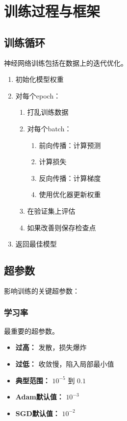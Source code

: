 %

\clearpage
\cleardoublepage

\chapter{训练过程与框架}

\section{训练循环}

神经网络训练包括在数据上的迭代优化。

\begin{algorithm}[训练循环]
\begin{enumerate}
    \item 初始化模型权重
    \item 对每个epoch：
    \begin{enumerate}
        \item 打乱训练数据
        \item 对每个batch：
        \begin{enumerate}
            \item 前向传播：计算预测
            \item 计算损失
            \item 反向传播：计算梯度
            \item 使用优化器更新权重
        \end{enumerate}
        \item 在验证集上评估
        \item 如果改善则保存检查点
    \end{enumerate}
    \item 返回最佳模型
\end{enumerate}
\end{algorithm}

\section{超参数}

影响训练的关键超参数：

\subsection{学习率}

最重要的超参数。

\begin{itemize}
    \item \textbf{过高：} 发散，损失爆炸
    \item \textbf{过低：} 收敛慢，陷入局部最小值
    \item \textbf{典型范围：} $10^{-5}$ 到 $0.1$
    \item \textbf{Adam默认值：} $10^{-3}$
    \item \textbf{SGD默认值：} $10^{-2}$
\end{itemize}

